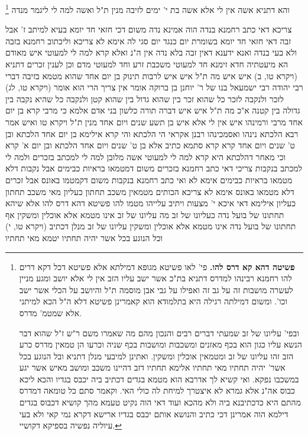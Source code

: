 \documentclass[12pt, openany]{book}
\newcommand{\footnotecomment}[1]{\footnote{#1}}
\newcommand{\commenta}[1]{\footnotecomment{#1}}
\begin{document}
{והא דתניא  אשה אין לי אלא אשה בת י' ימים לזיבה מנין ת"ל ואשה  למה לי  ליגמר מנדה 
\commenta{\textbf{פשיטה דהא קא דרס להו.}  פי' לאו פשיטא מגופא דמילתא אלא פשיטא דכל דקא דרים להו רחמנא רבינהו למדרס דתניא בת"כ אשר ישב עליו הזב אין לי אלא יושב ומגע מניין לעשרה מושבות זה על גב זה ואפילו על גבי אבן מוסמה ת"ל והיושב על הכלי אשר ישב וכו'. ומשום דמילתה רגילה היא בתלמודא הוא קאמרינן פשיטא דלא ה"ל הכא למיתני אלא שמטמ' מדרס.\par  ובפי' עליונו של זב שמעתי דברים רבים והנכון מהם מה שאמרו משם ר"ש ז"ל שהוא דבר הנשא עליו כגון הוא בכף מאזנים ומשכבות ומושבות בכף שניה וכרעו הן טמאין מדרס כרע הזב זהו עליונו של זב ומטמאין אוכלין ומשקין. ואתינן למיבעי מנלן דתניא ובל הנוגע בכל אשר' יהיה תחתיו מאי תחתיו אלימא תחתיו דזב דהיינו משכב ומושב מאיש אשר יגע במשכבו נפקא. ואי קשיא לך אדרבא הוא מטמא בגדים דכתיב ביה יכבס בגדיו והכא ליכא כבוס אה"נ אלא גמרא לא איצטרך למיחת לה כולי האי. וקאמר סתם כל טומאה דמדרס מהתם היא כדכתיבנא ביה ולא מהכא ועוד דאי הוה נקיט טעמא מהך קושיא דכבוס בגדים דילמא הוה אמרינן דכי כתיב והנושא אותם יכבס בגדיו ארישא דקרא נמי קאי ולא בעי עיוליה נפשיה בספיקא דקושיי. }

צריכא דאי כתב רחמנא בנדה הוה אמינא  נדה משום דכי חזאי חד יומא בעיא למיתב ז'  אבל זבה דאי חזאי חד יומא בשומרת יום כנגד יום סגי לה אימא  לא צריכא 
וליכתוב רחמנא בזבה ולא בעי בנדה ואנא ידענא דאין זבה בלא נדה  אין ה"נ  ואלא קרא למה לי  למעוטי איש מאודם 
הא מיעטתיה חדא זימנא  חד למעוטי משכבת זרע וחד למעוטי מדם 
וכן לענין זכרים  דתניא  (ויקרא טו, ב) איש איש מה ת"ל איש איש  לרבות תינוק בן יום אחד שהוא מטמא בזיבה דברי רבי יהודה 
רבי ישמעאל בנו של ר' יוחנן בן ברוקה אומר  אין צריך הרי הוא אומר  (ויקרא טו, לג) לזכר ולנקבה לזכר כל שהוא זכר בין שהוא גדול בין שהוא קטן  ולנקבה כל שהיא נקבה בין גדולה בין קטנה  א"כ מה ת"ל איש איש  דברה תורה כלשון בני אדם 
אלמא כי מרבי קרא בן יום אחד מרבי  ורמינהו  איש אין לי אלא איש בן תשע שנים ויום אחד מנין  ת"ל {ויקרא טו } ואיש 
אמר רבא  הלכתא נינהו ואסמכינהו רבנן אקראי  הי הלכתא והי קרא  אילימא בן יום אחד הלכתא ובן ט' שנים ויום אחד קרא קרא סתמא כתיב 
אלא בן ט' שנים ויום אחד הלכתא ובן יום א' קרא  וכי מאחר דהלכתא היא קרא למה לי  למעוטי אשה מלובן
למה לי למכתב בזכרים ולמה לי למכתב בנקבות
צריכי דאי כתב רחמנא בזכרים משום דמטמאו בראיות כבימים אבל נקבות דלא מטמאו בראיות כבימים אימא לא 
ואי כתב רחמנא בנקבות משום דקמטמו באונס אבל זכרים דלא מטמאו באונס אימא  לא צריכא
הכותים מטמאין משכב תחתון כעליון מאי משכב תחתון כעליון  אילימא דאי איכא י' מצעות ויתיב עלייהו מטמו להו פשיטא דהא דרס להו 
אלא שיהא תחתונו של בועל נדה כעליונו של זב מה עליונו של זב אינו מטמא אלא אוכלין ומשקין אף תחתונו של בועל נדה אינו מטמא אלא אוכלין ומשקין 
עליונו של זב מנלן  דכתיב (ויקרא טו, י) וכל הנוגע בכל אשר יהיה תחתיו יטמא מאי תחתיו}
\end{document}
